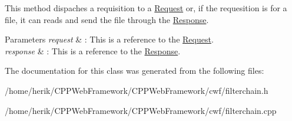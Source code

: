 This method dispaches a requisition to a \hyperlink{class_request}{Request} or, if the requesition is for a file, it can reads and send the file through the \hyperlink{class_response}{Response}. 


\begin{DoxyParams}{Parameters}
{\em request} & \+: This is a reference to the \hyperlink{class_request}{Request}. \\
\hline
{\em response} & \+: This is a reference to the \hyperlink{class_response}{Response}. \\
\hline
\end{DoxyParams}


The documentation for this class was generated from the following files\+:\begin{DoxyCompactItemize}
\item 
/home/herik/\+C\+P\+P\+Web\+Framework/\+C\+P\+P\+Web\+Framework/cwf/filterchain.\+h\item 
/home/herik/\+C\+P\+P\+Web\+Framework/\+C\+P\+P\+Web\+Framework/cwf/filterchain.\+cpp\end{DoxyCompactItemize}
